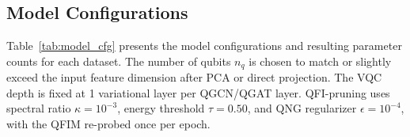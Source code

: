 \documentclass[journal]{IEEEtran}
\begin{document}
{\renewcommand{\arraystretch}{1.15}
\begin{table}[t]
  \centering
  \caption{Graph classification benchmark dataset statistics.}
  \label{tab:datasets}
\end{table}}

\subsection{Model Configurations}

Table~\ref{tab:model_cfg} presents the model configurations and resulting
parameter counts for each dataset. The number of qubits $n_q$ is chosen
to match or slightly exceed the input feature dimension after PCA or direct
projection. The VQC depth is fixed at 1 variational layer per QGCN/QGAT
layer. QFI-pruning uses spectral ratio $\kappa = 10^{-3}$, energy
threshold $\tau = 0.50$, and QNG regularizer $\epsilon = 10^{-4}$, with the
QFIM re-probed once per epoch.

{\renewcommand{\arraystretch}{1.15}
\begin{table}[t]
  \centering
  \caption{Model configurations and parameter counts per dataset.}
  \label{tab:model_cfg}
\end{table}}
\end{document}
